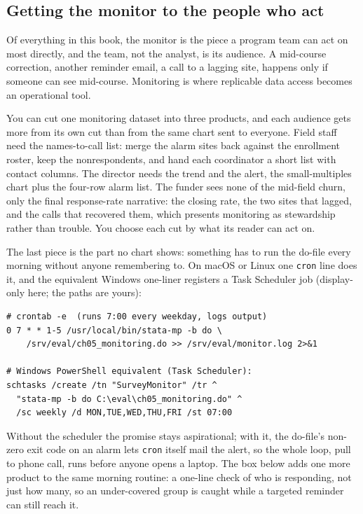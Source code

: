 \documentclass[
    a4paper,
    fontsize=10pt,
    twoside=true,
    numbers=noenddot,
]{kaobook}
\begin{document}
\subsection{Getting the monitor to the people who act}\label{sec:monitor-deliver}
Of everything in this book, the monitor is the piece a program team can act on most directly, and the team, not the analyst, is its audience. A mid-course correction, another reminder email, a call to a lagging site, happens only if someone can see mid-course. Monitoring is where replicable data access becomes an operational tool.

You can cut one monitoring dataset into three products, and each audience gets more from its own cut than from the same chart sent to everyone. Field staff need the names-to-call list: merge the alarm sites back against the enrollment roster, keep the nonrespondents, and hand each coordinator a short list with contact columns. The director needs the trend and the alert, the small-multiples chart plus the four-row alarm list. The funder sees none of the mid-field churn, only the final response-rate narrative: the closing rate, the two sites that lagged, and the calls that recovered them, which presents monitoring as stewardship rather than trouble. You choose each cut by what its reader can act on.

The last piece is the part no chart shows: something has to run the do-file every morning without anyone remembering to. On macOS or Linux one \texttt{cron} line does it, and the equivalent Windows one-liner registers a Task Scheduler job (display-only here; the paths are yours):
\par
{\footnotesize
\begin{verbatim}
# crontab -e  (runs 7:00 every weekday, logs output)
0 7 * * 1-5 /usr/local/bin/stata-mp -b do \
    /srv/eval/ch05_monitoring.do >> /srv/eval/monitor.log 2>&1

# Windows PowerShell equivalent (Task Scheduler):
schtasks /create /tn "SurveyMonitor" /tr ^
  "stata-mp -b do C:\eval\ch05_monitoring.do" ^
  /sc weekly /d MON,TUE,WED,THU,FRI /st 07:00
\end{verbatim}
}
Without the scheduler the promise stays aspirational; with it, the do-file's non-zero exit code on an alarm lets \texttt{cron} itself mail the alert, so the whole loop, pull to phone call, runs before anyone opens a laptop. The box below adds one more product to the same morning routine: a one-line check of who is responding, not just how many, so an under-covered group is caught while a targeted reminder can still reach it.
\end{document}
